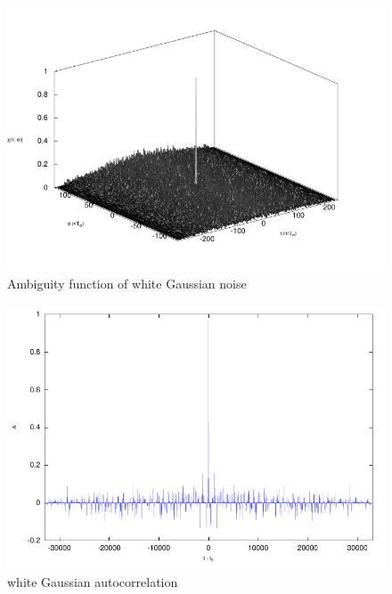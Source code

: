 \documentclass[a4paper]{report}
\numberwithin{equation}{chapter}
\begin{document}
\begin{figure}
\centering 
\includegraphics{Passive-Weather-Radar-Theory-fig-10.pdf}
\caption[Ambiguity function of white Gaussian noise]{Ambiguity function of white Gaussian noise}
\label{fig:10}
\end{figure}

\begin{figure}
\centering 
\includegraphics{Passive-Weather-Radar-Theory-fig-11.pdf}
\caption[white Gaussian noise autocorrelation]{white Gaussian autocorrelation}
\label{fig:11}
\end{figure}
\end{document}
